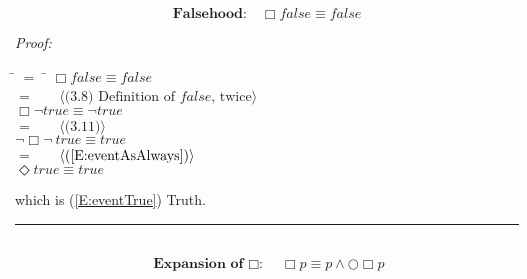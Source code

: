 \documentclass[fleqn, leqno]{article}
\newcommand{\lgap}{2pt}                             %
\newcommand{\mymathindent}{24pt}                    %
\newcommand{\Next}{\bigcirc}
\newcommand{\Event}{\Diamond}
\newcommand{\Always}{\Box}
\newcommand{\myqed}{\hfill\rule[-.23ex]{1.2ex}{2.0ex}}
\newcommand{\Gll} {\langle}                         %
\newcommand{\Ggg} {\rangle}                         %
\newcommand{\Hint}[1]     {\ \ \ $\Gll              \mbox{#1} \Ggg$ }   %
\begin{document}
\begin{equation}\label{E:alwaysFalse}
\textbf{Falsehood:}\quad \Always false \equiv false
\end{equation}

\emph{Proof:}
\begin{tabbing}
\hspace{\mymathindent} \= $= \;$ \= \kill
  \> \>   $\Always false \equiv false$\\[\lgap]
  \> $=$  \>  \Hint{(3.8) Definition of $false$, twice}\\[\lgap]
  \> \>   $\Always\lnot true \equiv \lnot true$\\[\lgap]
  \> $=$  \>  \Hint{(3.11)}\\[\lgap]
  \> \>   $\lnot\Always\lnot\ true \equiv true$\\[\lgap]
  \> $=$  \>  \Hint{(\ref{E:eventAsAlways})}\\[\lgap]
  \> \>   $\Event true \equiv true$\\[\lgap]
\end{tabbing}
which is (\ref{E:eventTrue}) Truth. \myqed\\[\lgap]


\begin{equation}\label{E:expansionAlways}
\textbf{Expansion of $\Always$:}\quad \Always p \equiv p \land \Next\Always p
\end{equation}
\end{document}
